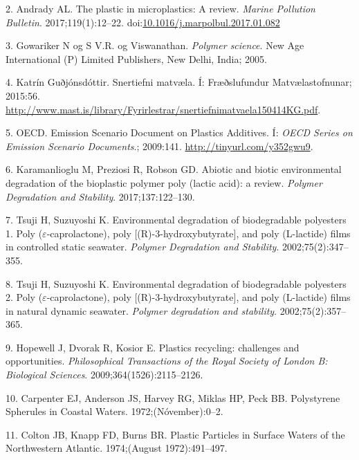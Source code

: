 \documentclass[icelandic,]{book}
\begin{document}
\leavevmode\hypertarget{ref-Andrady2017}{}%
2. Andrady AL. The plastic in microplastics: A review. \emph{Marine Pollution Bulletin}. 2017;119(1):12--22. doi:\href{https://doi.org/10.1016/j.marpolbul.2017.01.082}{10.1016/j.marpolbul.2017.01.082}

\leavevmode\hypertarget{ref-Gowariker2005}{}%
3. Gowariker N og S V.R. og Viswanathan. \emph{Polymer science}. New Age International (P) Limited Publishers, New Delhi, India; 2005.

\leavevmode\hypertarget{ref-Gudjonsdottir2015}{}%
4. Katrín Guðjónsdóttir. Snertiefni matvæla. Í: Fræðslufundur Matvælastofnunar; 2015:56. \url{http://www.mast.is/library/Fyrirlestrar/snertiefnimatvaela150414KG.pdf}.

\leavevmode\hypertarget{ref-OECD2009}{}%
5. OECD. Emission Scenario Document on Plastics Additives. Í: \emph{OECD Series on Emission Scenario Documents}.; 2009:141. \url{http://tinyurl.com/y352gwu9}.

\leavevmode\hypertarget{ref-karamanlioglu2017abiotic}{}%
6. Karamanlioglu M, Preziosi R, Robson GD. Abiotic and biotic environmental degradation of the bioplastic polymer poly (lactic acid): a review. \emph{Polymer Degradation and Stability}. 2017;137:122--130.

\leavevmode\hypertarget{ref-tsuji2002environmental-1}{}%
7. Tsuji H, Suzuyoshi K. Environmental degradation of biodegradable polyesters 1. Poly (\(\varepsilon\)-caprolactone), poly {[}(R)-3-hydroxybutyrate{]}, and poly (L-lactide) films in controlled static seawater. \emph{Polymer Degradation and Stability}. 2002;75(2):347--355.

\leavevmode\hypertarget{ref-tsuji2002environmental-2}{}%
8. Tsuji H, Suzuyoshi K. Environmental degradation of biodegradable polyesters 2. Poly (\(\varepsilon\)-caprolactone), poly {[}(R)-3-hydroxybutyrate{]}, and poly (L-lactide) films in natural dynamic seawater. \emph{Polymer degradation and stability}. 2002;75(2):357--365.

\leavevmode\hypertarget{ref-hopewell2009plastics}{}%
9. Hopewell J, Dvorak R, Kosior E. Plastics recycling: challenges and opportunities. \emph{Philosophical Transactions of the Royal Society of London B: Biological Sciences}. 2009;364(1526):2115--2126.

\leavevmode\hypertarget{ref-Waters1972}{}%
10. Carpenter EJ, Anderson JS, Harvey RG, Miklas HP, Peck BB. Polystyrene Spherules in Coastal Waters. 1972;(Nóvember):0--2.

\leavevmode\hypertarget{ref-Colton1974}{}%
11. Colton JB, Knapp FD, Burns BR. Plastic Particles in Surface Waters of the Northwestern Atlantic. 1974;(August 1972):491--497.
\end{document}

